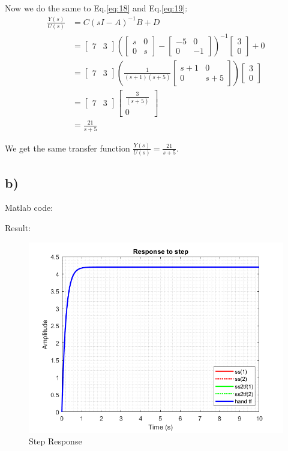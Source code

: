 Now we do the same to Eq.\ref{eq:18} and Eq.\ref{eq:19}:
\begin{equation}
    \begin{aligned}
        \frac{Y(s)}{U(s)} &= C(sI - A)^{-1}B + D \\
        &= \begin{bmatrix} 7 & 3 \end{bmatrix}
        (\begin{bmatrix} s & 0 \\ 0 & s \end{bmatrix} -
        \begin{bmatrix} -5 & 0 \\ 0 & -1 \end{bmatrix})^{-1}
        \begin{bmatrix} 3\\0\end{bmatrix} + 0 \\ 
        &= \begin{bmatrix} 7 & 3 \end{bmatrix}\left(\frac{1}{(s+1)(s+5)}\begin{bmatrix}
            s+1 & 0 \\
            0   & s+5
        \end{bmatrix}\right)\begin{bmatrix} 3\\0\end{bmatrix}\\ 
        &= \begin{bmatrix} 7 & 3 \end{bmatrix}\begin{bmatrix} \frac{3}{(s+5)} \\ 0 \end{bmatrix}\\ 
        &=\frac{21}{s+5}
    \end{aligned}
\end{equation}

We get the same transfer function $\frac{Y(s)}{U(s)} = \frac{21}{s+5}$.

\subsection{b)}
Matlab code:
    
Result:
\begin{figure}[htp]
    \centering
    \includegraphics[width=12cm]{images/Q6_b_fig.png}
    \caption{Step Response}
    \label{fig:Q6b}
\end{figure}
\pagebreak